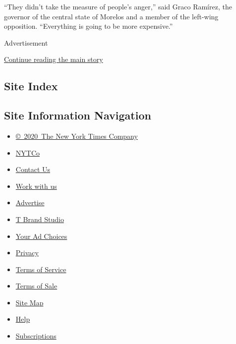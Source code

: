 ``They didn't take the measure of people's anger,'' said Graco Ramírez,
the governor of the central state of Morelos and a member of the
left-wing opposition. ``Everything is going to be more expensive.''

Advertisement

\protect\hyperlink{after-bottom}{Continue reading the main story}

\hypertarget{site-index}{%
\subsection{Site Index}\label{site-index}}

\hypertarget{site-information-navigation}{%
\subsection{Site Information
Navigation}\label{site-information-navigation}}

\begin{itemize}
\tightlist
\item
  \href{https://help.nytimes.com/hc/en-us/articles/115014792127-Copyright-notice}{©~2020~The
  New York Times Company}
\end{itemize}

\begin{itemize}
\tightlist
\item
  \href{https://www.nytco.com/}{NYTCo}
\item
  \href{https://help.nytimes.com/hc/en-us/articles/115015385887-Contact-Us}{Contact
  Us}
\item
  \href{https://www.nytco.com/careers/}{Work with us}
\item
  \href{https://nytmediakit.com/}{Advertise}
\item
  \href{http://www.tbrandstudio.com/}{T Brand Studio}
\item
  \href{https://www.nytimes.com/privacy/cookie-policy\#how-do-i-manage-trackers}{Your
  Ad Choices}
\item
  \href{https://www.nytimes.com/privacy}{Privacy}
\item
  \href{https://help.nytimes.com/hc/en-us/articles/115014893428-Terms-of-service}{Terms
  of Service}
\item
  \href{https://help.nytimes.com/hc/en-us/articles/115014893968-Terms-of-sale}{Terms
  of Sale}
\item
  \href{https://spiderbites.nytimes.com}{Site Map}
\item
  \href{https://help.nytimes.com/hc/en-us}{Help}
\item
  \href{https://www.nytimes.com/subscription?campaignId=37WXW}{Subscriptions}
\end{itemize}
